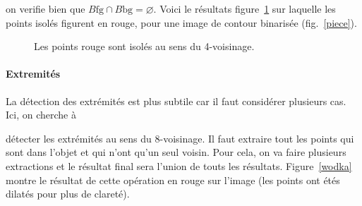 \documentclass[10pt,a4paper]{article}
\begin{document}
on verifie bien que $B{\text{fg}}\cap B{\text{bg}} = \varnothing$. Voici le r\'{e}sultats figure~\ref{points} sur laquelle les points isol\'{e}s figurent en rouge, pour une image de contour binaris\'{e}e (fig.~\ref{piece}).
\begin{figure}[h]
\hspace{0.05\textwidth}\scalebox{0.66}{}
\vspace{-25mm}
	\caption{Les points rouge sont isol\'{e}s au sens du 4-voisinage.}
	\label{points}
\end{figure}
\clearpage

\paragraph{Extremit\'{e}s} 
La d\'{e}tection des extr\'{e}mit\'{e}s est plus subtile car il faut consid\'{e}rer plusieurs cas. Ici, on cherche \`{a}{  d\'{e}tecter les extr\'{e}mit\'{e}s au sens du 8-voisinage. Il faut extraire tout les points qui sont dans l'objet et qui n'ont qu'un seul voisin. Pour cela, on va faire plusieurs extractions et le r\'{e}sultat final sera l'union de touts les r\'{e}sultats. Figure~\ref{wodka} montre le r\'{e}sultat de cette op\'{e}ration en rouge sur l'image (les points ont \'{e}t\'{e}s dilat\'{e}s pour plus de claret\'{e}).

}
\end{document}
